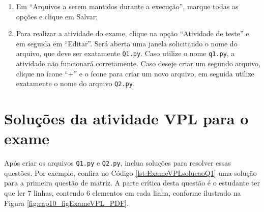 \begin{enumerate}
    \item Em ``Arquivos a serem mantidos durante a execução'', marque todas as opções e clique em Salvar;

    \item Para realizar a atividade do exame, clique na opção ``Atividade de teste'' e em seguida em ``Editar''. Será aberta uma janela solicitando o nome do arquivo, que deve ser exatamente \verb|Q1.py|. Caso utilize o nome \verb|q1.py|, a atividade não funcionará corretamente. Caso deseje criar um segundo arquivo, clique no ícone ``+'' e o ícone para criar um novo arquivo, em seguida utilize exatamente o nome do arquivo \verb|Q2.py|.
    
\end{enumerate}



\section{Soluções da atividade VPL para o exame}


Após criar os arquivos \verb|Q1.py| e \verb|Q2.py|, inclua soluções para resolver essas questões. Por exemplo, confira no Código \ref{lst:ExameVPLsolucaoQ1} uma solução para a primeira questão de matriz. A parte crítica desta questão é o estudante ter que ler 7 linhas, contendo 6 elementos em cada linha, conforme ilustrado na Figura \ref{fig:cap10_figExameVPL_PDF}. 


